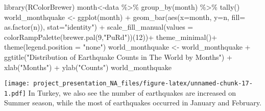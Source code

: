\documentclass[
]{article}
\newenvironment{Shaded}{\begin{snugshade}}{\end{snugshade}}
\newcommand{\AttributeTok}[1]{\textcolor[rgb]{0.77,0.63,0.00}{#1}}
\newcommand{\DecValTok}[1]{\textcolor[rgb]{0.00,0.00,0.81}{#1}}
\newcommand{\FunctionTok}[1]{\textcolor[rgb]{0.00,0.00,0.00}{#1}}
\newcommand{\NormalTok}[1]{#1}
\newcommand{\OtherTok}[1]{\textcolor[rgb]{0.56,0.35,0.01}{#1}}
\newcommand{\SpecialCharTok}[1]{\textcolor[rgb]{0.00,0.00,0.00}{#1}}
\newcommand{\StringTok}[1]{\textcolor[rgb]{0.31,0.60,0.02}{#1}}
\begin{document}
\begin{Shaded}
\begin{Highlighting}[]
\FunctionTok{library}\NormalTok{(RColorBrewer)}
\NormalTok{month}\OtherTok{\textless{}{-}}\NormalTok{data }\SpecialCharTok{\%\textgreater{}\%} \FunctionTok{group\_by}\NormalTok{(month) }\SpecialCharTok{\%\textgreater{}\%} \FunctionTok{tally}\NormalTok{()}
\NormalTok{world\_monthquake }\OtherTok{\textless{}{-}} \FunctionTok{ggplot}\NormalTok{(month) }\SpecialCharTok{+} \FunctionTok{geom\_bar}\NormalTok{(}\FunctionTok{aes}\NormalTok{(}\AttributeTok{x=}\NormalTok{month, }\AttributeTok{y=}\NormalTok{n, }\AttributeTok{fill=} \FunctionTok{as.factor}\NormalTok{(n)), }\AttributeTok{stat=}\StringTok{"identity"}\NormalTok{) }\SpecialCharTok{+}
     \FunctionTok{scale\_fill\_manual}\NormalTok{(}\AttributeTok{values =} \FunctionTok{colorRampPalette}\NormalTok{(}\FunctionTok{brewer.pal}\NormalTok{(}\DecValTok{9}\NormalTok{,}\StringTok{"PuRd"}\NormalTok{))(}\DecValTok{12}\NormalTok{))}\SpecialCharTok{+}
     \FunctionTok{theme\_minimal}\NormalTok{()}\SpecialCharTok{+}
     \FunctionTok{theme}\NormalTok{(}\AttributeTok{legend.position =} \StringTok{"none"}\NormalTok{)}
\NormalTok{world\_monthquake }\OtherTok{\textless{}{-}}\NormalTok{ world\_monthquake }\SpecialCharTok{+} \FunctionTok{ggtitle}\NormalTok{(}\StringTok{"Distribution of Earthquake Counts in The World by Months"}\NormalTok{) }\SpecialCharTok{+} \FunctionTok{xlab}\NormalTok{(}\StringTok{"Months"}\NormalTok{) }\SpecialCharTok{+} \FunctionTok{ylab}\NormalTok{(}\StringTok{"Counts"}\NormalTok{)}
\NormalTok{world\_monthquake}
\end{Highlighting}
\end{Shaded}

\texttt{[image: project\_presentation\_NA\_files/figure-latex/unnamed-chunk-17-1.pdf]}
In Turkey, we also see the number of earthquakes are increased on Summer
season, while the most of earthquakes occurred in January and February.
\end{document}
